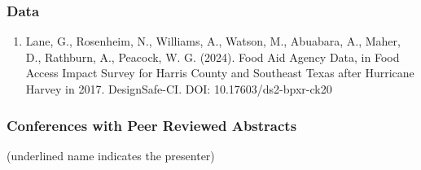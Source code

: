 \documentclass[11pt,oneside]{article}
\begin{document}
\subsubsection{Data}
\begin{enumerate}[leftmargin=40pt]
\item Lane, G., Rosenheim, N., Williams, A., Watson, M., Abuabara, A., Maher, D., Rathburn, A., Peacock, W. G. (2024). Food Aid Agency Data, in Food Access Impact Survey for Harris County and Southeast Texas after Hurricane Harvey in 2017. DesignSafe-CI. DOI: 10.17603/ds2-bpxr-ck20
\end{enumerate}

\subsubsection{Conferences with Peer Reviewed Abstracts}
{\small (underlined name indicates the presenter)}
\end{document}
